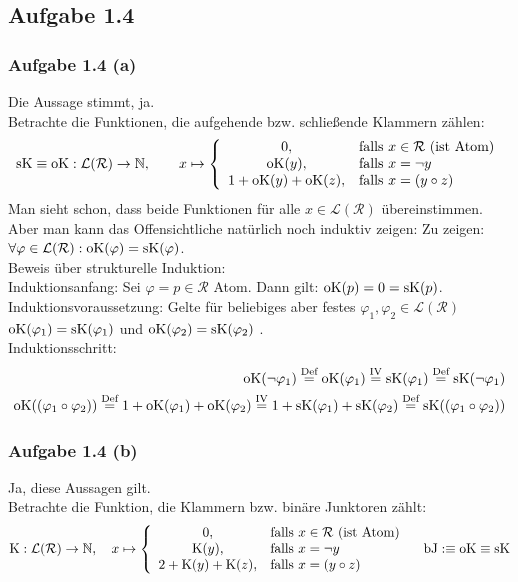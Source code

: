 \subsection{Aufgabe 1.4}
\subsubsection{Aufgabe 1.4 (a)}
Die Aussage stimmt, ja.\\
Betrachte die Funktionen, die aufgehende bzw. schließende Klammern zählen:
\begin{align*}
	\operatorname{sK}\equiv\operatorname{oK}:\mathcal{L}(\mathcal{R})\to\mathbb{N},\qquad
	x\mapsto\left\lbrace\begin{array}{cl}
		0, & \text{falls } x\in\mathcal{R}\text{ (ist Atom)}\\
		\operatorname{oK}(y), & \text{falls } x=\neg y\\
		1+\operatorname{oK}(y)+\operatorname{oK}(z), & \text{falls } x=(y\circ z)
	\end{array}\right.
\end{align*}
Man sieht schon, dass beide Funktionen für alle $x\in\mathcal{L}(\mathcal{R})$ übereinstimmen. 
Aber man kann das Offensichtliche natürlich noch induktiv zeigen:\nl
Zu zeigen: $\forall\varphi\in\mathcal{L}(\mathcal{R}):\operatorname{oK}(\varphi)=\operatorname{sK}(\varphi)$.\\
Beweis über strukturelle Induktion:\\
Induktionsanfang: Sei $\varphi=p\in\mathcal{R}$ Atom. Dann gilt: $\operatorname{oK}(p)=0=\operatorname{sK}(p)$.\\
Induktionsvoraussetzung: Gelte für beliebiges aber festes $\varphi_1,\varphi_2\in\mathcal{L}(\mathcal{R})$\\ $\operatorname{oK}(\varphi_1)=\operatorname{sK}(\varphi_1)$ und $\operatorname{oK}(\varphi_2)=\operatorname{sK}(\varphi_2)$ .\\ 
Induktionsschritt:
\begin{align*}
	\operatorname{oK}(\neg \varphi_1)
	\stackrel{\text{Def}}{=}\operatorname{oK}(\varphi_1)
	\stackrel{\text{IV}}{=}\operatorname{sK}(\varphi_1)
	\stackrel{\text{Def}}{=}\operatorname{sK}(\neg \varphi_1)\\
	\operatorname{oK}((\varphi_1\circ \varphi_2))
	\stackrel{\text{Def}}{=}1+\operatorname{oK}(\varphi_1)+\operatorname{oK}(\varphi_2)
	\stackrel{\text{IV}}{=}1+\operatorname{sK}(\varphi_1)+\operatorname{sK}(\varphi_2)
	\stackrel{\text{Def}}{=}\operatorname{sK}((\varphi_1\circ \varphi_2))
\end{align*}

\subsubsection{Aufgabe 1.4 (b)}
Ja, diese Aussagen gilt.\\
Betrachte die Funktion, die Klammern bzw. binäre Junktoren zählt:
\begin{align*}
	\text{K}:\mathcal{L}(\mathcal{R})\to\mathbb{N},\quad
		x\mapsto\left\lbrace\begin{array}{cl}
		0, & \text{falls } x\in\mathcal{R}\text{ (ist Atom)}\\
		\text{K}(y), & \text{falls } x=\neg y\\
		2+\text{K}(y)+\text{K}(z), & \text{falls } x=(y\circ z)
	\end{array}\right.
	\quad \operatorname{bJ}:\equiv \operatorname{oK}\equiv\operatorname{sK}
\end{align*}

